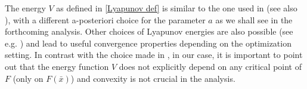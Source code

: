 \documentclass[reqno]{amsart}
\theoremstyle{plain}
\theoremstyle{definition}
\theoremstyle{remark}
\DeclarePairedDelimiter{\norm}{\lVert}{\rVert}	%
\begin{document}
The energy $V$ as defined in \eqref{Lyapunov def} is similar to the one used in \cite{alvarez2002second} (see also \cite{castera2021inertial}), with a different a-posteriori choice for the  parameter $a$ as we shall see in the forthcoming analysis. 
Other choices of Lyapunov energies are also possible (see e.g. \cite{attouch2022first,aujol2023fast}) and lead to useful convergence properties depending on the optimization setting. In contrast with the choice made in \cite{attouch2022first}, in our case, it is important to point out  that the energy function $V$ does not explicitly depend on any critical point of $F$ (only on $F(\bar{x})$) and convexity is not crucial in the analysis. 
\end{document}
